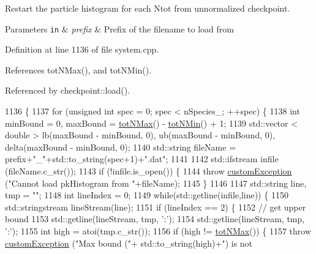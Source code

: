 Restart the particle histogram for each Ntot from unnormalized checkpoint. 


\begin{DoxyParams}[1]{Parameters}
\mbox{\tt in}  & {\em prefix} & Prefix of the filename to load from \\
\hline
\end{DoxyParams}


Definition at line 1136 of file system.\-cpp.



References tot\-N\-Max(), and tot\-N\-Min().



Referenced by checkpoint\-::load().


\begin{DoxyCode}
1136                                                           \{
1137     \textcolor{keywordflow}{for} (\textcolor{keywordtype}{unsigned} \textcolor{keywordtype}{int} spec = 0; spec < nSpecies\_; ++spec) \{
1138         \textcolor{keywordtype}{int} minBound = 0, maxBound = \hyperlink{classsim_system_aee2c65ecb43a35c0c4d070cdb45f7dc0}{totNMax}() - \hyperlink{classsim_system_af10842e0eaa638373b8717c87b47e6bc}{totNMin}() + 1;
1139         std::vector < double > lb(maxBound - minBound, 0), ub(maxBound - minBound, 0), delta(maxBound - 
      minBound, 0);
1140         std::string fileName = prefix+\textcolor{stringliteral}{"\_"}+std::to\_string(spec+1)+\textcolor{stringliteral}{".dat"};
1141 
1142         std::ifstream infile (fileName.c\_str());
1143         \textcolor{keywordflow}{if} (!infile.is\_open()) \{
1144             \textcolor{keywordflow}{throw} \hyperlink{classcustom_exception}{customException} (\textcolor{stringliteral}{"Cannot load pkHistogram from "}+fileName);
1145         \}
1146 
1147         std::string line, tmp = \textcolor{stringliteral}{""};
1148         \textcolor{keywordtype}{int} lineIndex = 0;
1149         \textcolor{keywordflow}{while}(std::getline(infile,line)) \{
1150             std::stringstream lineStream(line);
1151             \textcolor{keywordflow}{if} (lineIndex == 2) \{
1152                 \textcolor{comment}{// get upper bound}
1153                 std::getline(lineStream, tmp, \textcolor{charliteral}{':'});
1154                 std::getline(lineStream, tmp, \textcolor{charliteral}{':'});
1155                 \textcolor{keywordtype}{int} high = atoi(tmp.c\_str());
1156                 \textcolor{keywordflow}{if} (high != \hyperlink{classsim_system_aee2c65ecb43a35c0c4d070cdb45f7dc0}{totNMax}()) \{
1157                     \textcolor{keywordflow}{throw} \hyperlink{classcustom_exception}{customException} (\textcolor{stringliteral}{"Max bound ("}+ std::to\_string(high)+\textcolor{stringliteral}{") is not
}
\end{DoxyCode}
